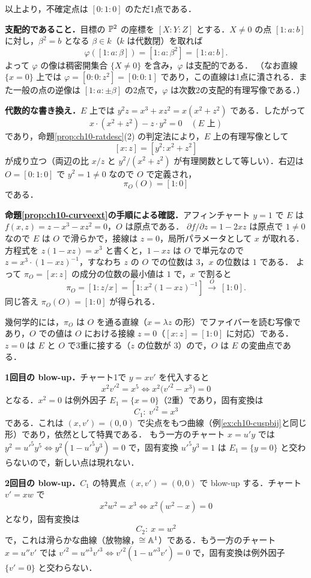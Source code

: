 以上より，不確定点は $[0:1:0]$ のただ1点である．

\textbf{支配的であること．}目標の $\mathbb{P}^2$ の座標を $[X:Y:Z]$ とする．$X\neq0$ の点 $[1:a:b]$ に対し，$\beta^2=b$ となる $\beta\in k$（$k$ は代数閉）を取れば
\[
  \varphi([1:a:\beta])=[1:a:\beta^2]=[1:a:b].
\]
よって $\varphi$ の像は稠密開集合 $\{X\neq0\}$ を含み，$\varphi$ は支配的である．
（なお直線 $\{x=0\}$ 上では $\varphi=[0:0:z^2]=[0:0:1]$ であり，この直線は1点に潰される．また一般の点の逆像は $[1:a:\pm\beta]$ の2点で，$\varphi$ は次数2の支配的有理写像である．）

\textbf{代数的な書き換え．}$E$ 上では $y^2z=x^3+xz^2=x(x^2+z^2)$ である．したがって
\[
  x\cdot(x^2+z^2)-z\cdot y^2=0\quad(E\text{ 上})
\]
であり，命題\ref{prop:ch10-ratdesc}(2) の判定法により，$E$ 上の有理写像として
\[
  [x:z]=[y^2:x^2+z^2]
\]
が成り立つ（両辺の比 $x/z$ と $y^2/(x^2+z^2)$ が有理関数として等しい）．右辺は $O=[0:1:0]$ で $y^2=1\neq0$ なので $O$ で定義され，
\[
  \pi_O(O)=[1:0]
\]
である．

\textbf{命題\ref{prop:ch10-curveext}の手順による確認．}アフィンチャート $y=1$ で $E$ は $f(x,z)=z-x^3-xz^2=0$，$O$ は原点である．
$\partial f/\partial z=1-2xz$ は原点で $1\neq0$ なので $E$ は $O$ で滑らかで，接線は $z=0$，局所パラメータとして $x$ が取れる．
方程式を $z(1-xz)=x^3$ と書くと，$1-xz$ は $O$ で単元なので $z=x^3\cdot(1-xz)^{-1}$，すなわち $z$ の $O$ での位数は $3$，$x$ の位数は $1$ である．
よって $\pi_O=[x:z]$ の成分の位数の最小値は $1$ で，$x$ で割ると
\[
  \pi_O=[1:z/x]=[1:x^2(1-xz)^{-1}]\ \xrightarrow{\ O\ }\ [1:0].
\]
同じ答え $\pi_O(O)=[1:0]$ が得られる．

幾何学的には，$\pi_O$ は $O$ を通る直線（$x=\lambda z$ の形）でファイバーを読む写像であり，$O$ での値は $O$ における接線 $z=0$（$[x:z]=[1:0]$ に対応）である．
$z=0$ は $E$ と $O$ で3重に接する（$z$ の位数が $3$）ので，$O$ は $E$ の変曲点である．

\textbf{1回目の blow-up．}チャート1で $y=xv'$ を代入すると
\[
  x^2v'^2=x^5\iff x^2\bigl(v'^2-x^3\bigr)=0
\]
となる．$x^2=0$ は例外因子 $E_1=\{x=0\}$（2重）であり，固有変換は
\[
  C_1:\ v'^2=x^3
\]
である．これは $(x,v')=(0,0)$ で尖点をもつ曲線（例\ref{ex:ch10-cuspbij}と同じ形）であり，依然として特異である．
もう一方のチャート $x=u'y$ では $y^2=u'^5y^5\iff y^2(1-u'^5y^3)=0$ で，固有変換 $u'^5y^3=1$ は $E_1=\{y=0\}$ と交わらないので，新しい点は現れない．

\textbf{2回目の blow-up．}$C_1$ の特異点 $(x,v')=(0,0)$ で blow-up する．チャート $v'=xw$ で
\[
  x^2w^2=x^3\iff x^2(w^2-x)=0
\]
となり，固有変換は
\[
  C_2:\ x=w^2
\]
で，これは滑らかな曲線（放物線，$\cong\mathbb{A}^1$）である．もう一方のチャート $x=u''v'$ では $v'^2=u''^3v'^3\iff v'^2(1-u''^3v')=0$ で，固有変換は例外因子 $\{v'=0\}$ と交わらない．

